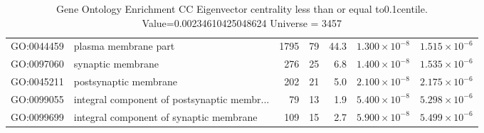 \begin{table}[ht]
\begin{adjustbox}{width=\textwidth}
\begin{tabular}{llrrrrr}
  GO:0044459 & plasma membrane part & 1795 & 79 & 44.3 & $1.300 \times 10^{-8}$ & $1.515 \times 10^{-6}$ \\ 
  GO:0097060 & synaptic membrane & 276 & 25 & 6.8 & $1.400 \times 10^{-8}$ & $1.535 \times 10^{-6}$ \\ 
  GO:0045211 & postsynaptic membrane & 202 & 21 & 5.0 & $2.100 \times 10^{-8}$ & $2.175 \times 10^{-6}$ \\ 
  GO:0099055 & integral component of postsynaptic membr... & 79 & 13 & 1.9 & $5.400 \times 10^{-8}$ & $5.298 \times 10^{-6}$ \\ 
  GO:0099699 & integral component of synaptic membrane & 109 & 15 & 2.7 & $5.900 \times 10^{-8}$ & $5.499 \times 10^{-6}$ \\ 
   \hline
\end{tabular}
\end{adjustbox}
\caption{Gene Ontology Enrichment CC Eigenvector centrality  less than or equal to0.1centile.   Value=0.00234610425048624 Universe = 3457} 
\label{tab:Gene Ontology Enrichment CC Eigenvector centrality  less than or equal to0.1centile.   Value=0.00234610425048624 Universe = 3457}
\end{table}
